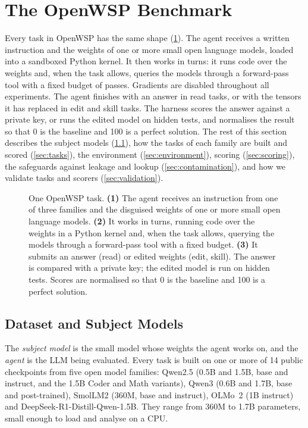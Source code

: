 \documentclass[11pt]{article}
\newcommand{\bench}{OpenWSP\xspace}
\begin{document}
\section{The \bench Benchmark}\label{sec:benchmark}

Every task in \bench has the same shape (\cref{fig:overview}). The agent receives a written
instruction and the weights of one or more small open language models, loaded into a
sandboxed Python kernel. It then works in turns: it runs code over the weights and, when the
task allows, queries the models through a forward-pass tool with a fixed budget of passes.
Gradients are disabled throughout all experiments. The agent finishes with an answer in read tasks, or with the
tensors it has replaced in edit and skill tasks. The harness scores the answer against a
private key, or runs the edited model on hidden tests, and normalises the result so that 0 is
the baseline and 100 is a perfect solution. The rest of this section describes the subject models
(\cref{sec:dataset}), how the tasks of each family are built and scored (\cref{sec:tasks}), the
environment (\cref{sec:environment}), scoring (\cref{sec:scoring}), the safeguards against
leakage and lookup (\cref{sec:contamination}), and how we validate tasks and scorers
(\cref{sec:validation}).

\begin{figure}[t]
  \centering
  
  \caption{One \bench task. \textbf{(1)} The agent receives an instruction from one of three
  families and the disguised weights of one or more small open language models.
  \textbf{(2)} It works in turns, running code over the weights in a Python kernel and, when
  the task allows, querying the models through a forward-pass tool with a fixed budget.
  \textbf{(3)} It submits an answer (read) or edited weights (edit, skill). The answer is
  compared with a private key; the edited model is run on hidden tests. Scores are normalised
  so that 0 is the baseline and 100 is a perfect solution.}
  \label{fig:overview}
\end{figure}

\subsection{Dataset and Subject Models}\label{sec:dataset}

The \emph{subject model} is the small model whose weights the agent works on, and the \emph{agent} is the LLM
being evaluated. Every task is built on one or more of 14 public checkpoints from five open
model families: Qwen2.5 (0.5B and 1.5B, base and instruct,
and the 1.5B Coder and Math variants), Qwen3 (0.6B and 1.7B, base and post-trained), SmolLM2
(360M, base and instruct), OLMo~2 (1B instruct) and DeepSeek-R1-Distill-Qwen-1.5B. They range
from 360M to 1.7B parameters, small enough to load and analyse on a CPU.
\end{document}
